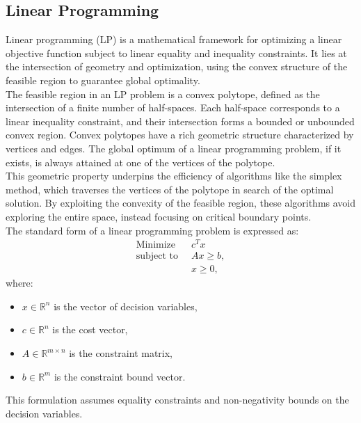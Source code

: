 \documentclass[10pt]{article}
\begin{document}
\subsection{Linear Programming}


Linear programming (LP) is a mathematical framework for optimizing a linear objective function subject to linear equality and inequality constraints. It lies at the intersection of geometry and optimization, using the convex structure of the feasible region to guarantee global optimality.\\

The feasible region in an LP problem is a convex polytope, defined as the intersection of a finite number of half-spaces. Each half-space corresponds to a linear inequality constraint, and their intersection forms a bounded or unbounded convex region. Convex polytopes have a rich geometric structure characterized by vertices and edges. The global optimum of a linear programming problem, if it exists, is always attained at one of the vertices of the polytope.\\

This geometric property underpins the efficiency of algorithms like the simplex method, which traverses the vertices of the polytope in search of the optimal solution. By exploiting the convexity of the feasible region, these algorithms avoid exploring the entire space, instead focusing on critical boundary points.\\

The standard form of a linear programming problem is expressed as:
\[
\begin{aligned}
\text{Minimize } & \ c^T x \\
\text{subject to } & \ A x \geq b, \\
& \ x \geq 0,
\end{aligned}
\]
where:
\begin{itemize}
    \item $x \in \mathbb{R}^n$ is the vector of decision variables,
    \item $c \in \mathbb{R}^n$ is the cost vector,
    \item $A \in \mathbb{R}^{m \times n}$ is the constraint matrix,
    \item $b \in \mathbb{R}^m$ is the constraint bound vector.
\end{itemize}

This formulation assumes equality constraints and non-negativity bounds on the decision variables. \\
\end{document}
